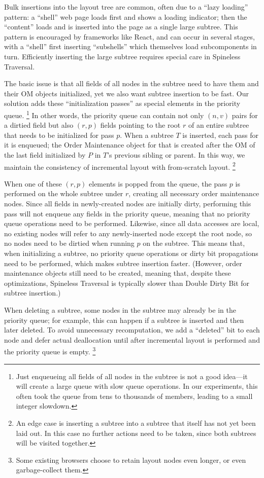\label{sec:tree-insertion}
Bulk insertions into the layout tree are common,
  often due to a ``lazy loading'' pattern:
  a ``shell'' web page loads first and shows a loading indicator;
  then the ``content'' loads and is inserted into the page
  as a single large subtree.
This pattern is encouraged by frameworks like React,
  and can occur in several stages, with a ``shell''
  first inserting ``subshells'' which
  themselves load subcomponents in turn.
Efficiently inserting the large subtree
  requires special care in Spineless Traversal.

The basic issue is that all fields of all nodes in the subtree
  need to have them and their OM objects initialized,
  yet we also want subtree insertion to be fast.
Our solution adds these ``initialization passes''
  as special elements in the priority queue.%
\footnote{
  Just enqueueing all fields of all nodes in the subtree
    is not a good idea---it will create a large queue with slow queue operations.
  In our experiments, this often took the queue
    from tens to thousands of members,
    leading to a small integer slowdown.
}
In other words, the priority queue can contain
  not only $(n, v)$ pairs for a dirtied field
  but also $(r, p)$ fields pointing to the root $r$
  of an entire subtree that needs to be initialized
  for pass $p$.
When a subtree $T$ is inserted, each pass for it is enqueued;
  the Order Maintenance object for that
  is created after the OM of the last field
  initialized by $P$ in $T$'s previous sibling or parent.
In this way, we maintain the consistency of incremental layout 
  with from-scratch layout.
\footnote{
  An edge case is inserting a subtree into
    a subtree that itself has not yet been laid out.
  In this case no further actions need to be taken,
    since both subtrees will be visited together.}

When one of these $(r, p)$ elements is popped from the queue,
  the pass $p$ is performed on the whole subtree under $r$,
  creating all necessary order maintenance nodes.
Since all fields in newly-created nodes are initially dirty,
  performing this pass will not enqueue any fields
  in the priority queue,
  meaning that no priority queue operations
  need to be performed.
Likewise, since all data accesses are local,
  no existing nodes will refer to any newly-inserted node
  except the root node,
  so no nodes need to be dirtied when running $p$ on the subtree.
This means that, when initializing a subtree,
  no priority queue operations or dirty bit propagations
  need to be performed,
  which makes subtree insertion faster.
(However, order maintenance objects still need to be created,
  meaning that, despite these optimizations,
  Spineless Traversal is typically
  slower than Double Dirty Bit
  for subtree insertion.)

When deleting a subtree,
  some nodes in the subtree may
  already be in the priority queue;
  for example, this can happen if
  a subtree is inserted and then later deleted.
To avoid unnecessary recomputation,
  we add a ``deleted'' bit to each node
  and defer actual deallocation
  until after incremental layout is performed
  and the priority queue is empty.%
\footnote{Some existing browsers choose
  to retain layout nodes even longer,
  or even garbage-collect them.
}